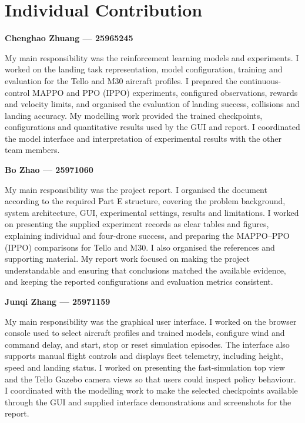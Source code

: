 \hypertarget{individual-contribution}{%
\section{Individual Contribution}\label{individual-contribution}}

\textbf{Chenghao Zhuang --- 25965245}

My main responsibility was the reinforcement learning models and experiments. I worked on the landing task representation, model configuration, training and evaluation for the Tello and M30 aircraft profiles. I prepared the continuous-control MAPPO and PPO (IPPO) experiments, configured observations, rewards and velocity limits, and organised the evaluation of landing success, collisions and landing accuracy. My modelling work provided the trained checkpoints, configurations and quantitative results used by the GUI and report. I coordinated the model interface and interpretation of experimental results with the other team members.

\textbf{Bo Zhao --- 25971060}

My main responsibility was the project report. I organised the document according to the required Part E structure, covering the problem background, system architecture, GUI, experimental settings, results and limitations. I worked on presenting the supplied experiment records as clear tables and figures, explaining individual and four-drone success, and preparing the MAPPO--PPO (IPPO) comparisons for Tello and M30. I also organised the references and supporting material. My report work focused on making the project understandable and ensuring that conclusions matched the available evidence, and keeping the reported configurations and evaluation metrics consistent.

\textbf{Junqi Zhang --- 25971159}

My main responsibility was the graphical user interface. I worked on the browser console used to select aircraft profiles and trained models, configure wind and command delay, and start, stop or reset simulation episodes. The interface also supports manual flight controls and displays fleet telemetry, including height, speed and landing status. I worked on presenting the fast-simulation top view and the Tello Gazebo camera views so that users could inspect policy behaviour. I coordinated with the modelling work to make the selected checkpoints available through the GUI and supplied interface demonstrations and screenshots for the report.

